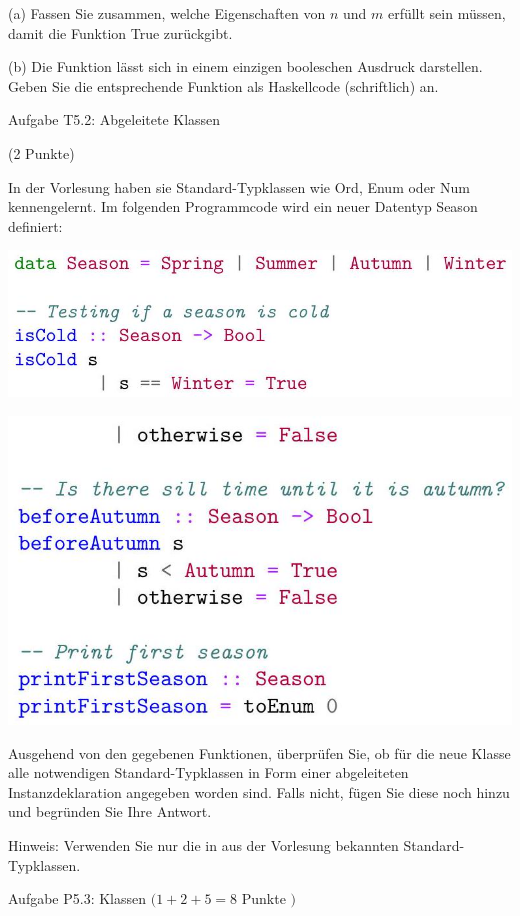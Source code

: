 \documentclass[10pt]{article}
\begin{document}
(a) Fassen Sie zusammen, welche Eigenschaften von $n$ und $m$ erfüllt sein müssen, damit die Funktion True zurückgibt.

(b) Die Funktion lässt sich in einem einzigen booleschen Ausdruck darstellen. Geben Sie die entsprechende Funktion als Haskellcode (schriftlich) an.

Aufgabe T5.2: Abgeleitete Klassen

(2 Punkte)

In der Vorlesung haben sie Standard-Typklassen wie Ord, Enum oder Num kennengelernt. Im folgenden Programmcode wird ein neuer Datentyp Season definiert:

\includegraphics[max width=\textwidth]{2022_11_15_0a5a2eee0aef383b0ce9g-1(1)}

\includegraphics[max width=\textwidth]{2022_11_15_0a5a2eee0aef383b0ce9g-2}

Ausgehend von den gegebenen Funktionen, überprüfen Sie, ob für die neue Klasse alle notwendigen Standard-Typklassen in Form einer abgeleiteten Instanzdeklaration angegeben worden sind. Falls nicht, fügen Sie diese noch hinzu und begründen Sie Ihre Antwort.

Hinweis: Verwenden Sie nur die in aus der Vorlesung bekannten Standard-Typklassen.

Aufgabe P5.3: Klassen $(1+2+5=8$ Punkte $)$
\end{document}

